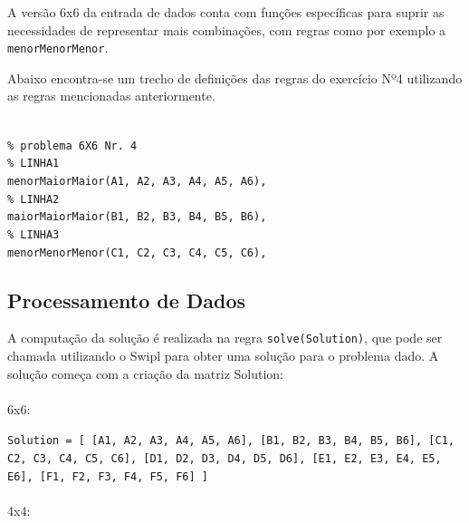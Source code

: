\documentclass{article}
\begin{document}
A versão 6x6 da entrada de dados conta com funções específicas para suprir as necessidades de representar mais combinações, com regras como por exemplo a \texttt{menorMenorMenor}.

Abaixo encontra-se um trecho de definições das regras do exercício Nº4 utilizando as regras mencionadas anteriormente.

\texttt{
\\
\% problema 6X6 Nr. 4\\
\% LINHA1\\
menorMaiorMaior(A1, A2, A3, A4, A5, A6),\\
\% LINHA2\\
maiorMaiorMaior(B1, B2, B3, B4, B5, B6),\\
\% LINHA3\\
menorMenorMenor(C1, C2, C3, C4, C5, C6),\\
}

\subsection{Processamento de Dados}

A computação da solução é realizada na regra \texttt{solve(Solution)}, que pode ser chamada utilizando o Swipl para obter uma solução para o problema dado.
A solução começa com a criação da matriz Solution:
\\
\\
6x6:

\texttt{Solution = [
    	[A1, A2, A3, A4, A5, A6],
    	[B1, B2, B3, B4, B5, B6],
    	[C1, C2, C3, C4, C5, C6],
    	[D1, D2, D3, D4, D5, D6],
    	[E1, E2, E3, E4, E5, E6],
    	[F1, F2, F3, F4, F5, F6]
	]}
\\
\\
4x4:
\end{document}
